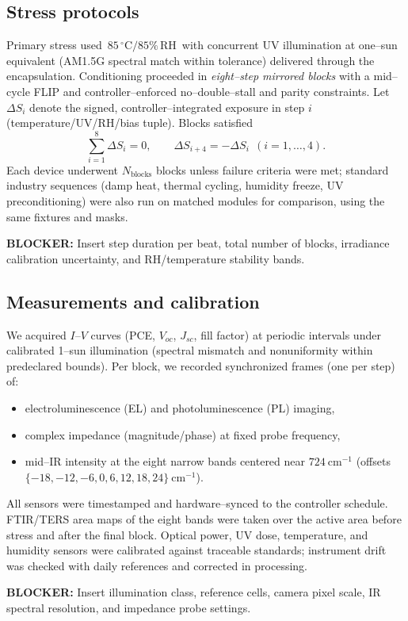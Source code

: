 \documentclass[12pt]{article}
\begin{document}
\subsection*{Stress protocols}
Primary stress used \,$85\,^{\circ}\mathrm{C}/85\%\,\mathrm{RH}$\, with concurrent UV illumination at one–sun equivalent (AM1.5G spectral match within tolerance) delivered through the encapsulation. Conditioning proceeded in \emph{eight–step mirrored blocks} with a mid–cycle FLIP and controller–enforced no–double–stall and parity constraints. Let $\Delta S_i$ denote the signed, controller–integrated exposure in step $i$ (temperature/UV/RH/bias tuple). Blocks satisfied
\[
\sum_{i=1}^{8}\Delta S_i=0,\qquad \Delta S_{i+4}=-\Delta S_i\ \ (i=1,\dots,4).
\]
Each device underwent $N_{\mathrm{blocks}}$ blocks unless failure criteria were met; standard industry sequences (damp heat, thermal cycling, humidity freeze, UV preconditioning) were also run on matched modules for comparison, using the same fixtures and masks.
\par\noindent\textbf{BLOCKER:} Insert step duration per beat, total number of blocks, irradiance calibration uncertainty, and RH/temperature stability bands.

\subsection*{Measurements and calibration}
We acquired $I$–$V$ curves (PCE, $V_{\!oc}$, $J_{\!sc}$, fill factor) at periodic intervals under calibrated 1–sun illumination (spectral mismatch and nonuniformity within predeclared bounds). Per block, we recorded synchronized frames (one per step) of:
\begin{itemize}
  \item electroluminescence (EL) and photoluminescence (PL) imaging,
  \item complex impedance (magnitude/phase) at fixed probe frequency,
  \item mid–IR intensity at the eight narrow bands centered near $724~\mathrm{cm}^{-1}$ (offsets $\{-18,-12,-6,0,6,12,18,24\}~\mathrm{cm}^{-1}$).
\end{itemize}
All sensors were timestamped and hardware–synced to the controller schedule. FTIR/TERS area maps of the eight bands were taken over the active area before stress and after the final block. Optical power, UV dose, temperature, and humidity sensors were calibrated against traceable standards; instrument drift was checked with daily references and corrected in processing.
\par\noindent\textbf{BLOCKER:} Insert illumination class, reference cells, camera pixel scale, IR spectral resolution, and impedance probe settings.
\end{document}
